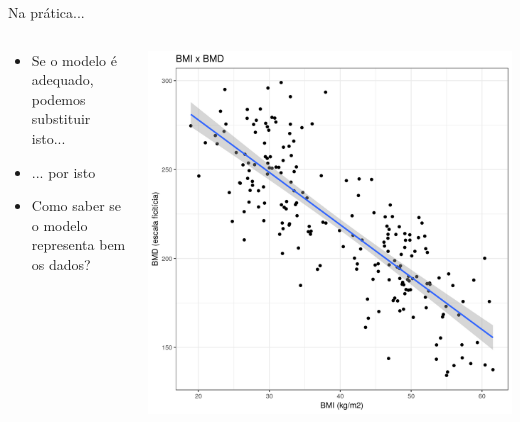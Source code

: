 \documentclass{beamer}
\begin{document}
\begin{frame}{Na prática...}
  \begin{columns}
    \begin{column}{5cm}
      \begin{itemize}
        \small
      \item \alert{Se o modelo é adequado}, podemos substituir isto...
        \bigskip
      \item<0> ... por isto
        \bigskip
      \item<0> Como saber se o modelo representa bem os dados?
      \end{itemize}
    \end{column}
    \begin{column}{5cm}
      \begin{center}
        \includegraphics[width=1.1\textwidth]{Cap18-19/pratica-rls2}
      \end{center}
    \end{column}
  \end{columns}
\end{frame}
\end{document}
